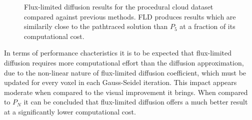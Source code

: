 \begin{figure}[h]
\caption{Flux-limited diffusion results for the procedural cloud dataset compared against previous methods. FLD produces results which are similarily close to the pathtraced solution than $P_5$ at a fraction of its computational cost.}
\label{fig:fld_results_nebulae}
\end{figure}

In terms of performance chacteristics it is to be expected that flux-limited diffusion requires more computational effort than the diffusion approximation, due to the non-linear nature of flux-limited diffusion coefficient, which must be updated for every voxel in each Gauss-Seidel iteration. This impact appears moderate when compared to the visual improvement it brings. When compared to $P_N$ it can be concluded that flux-limited diffusion offers a much better result at a significantly lower computational cost.

